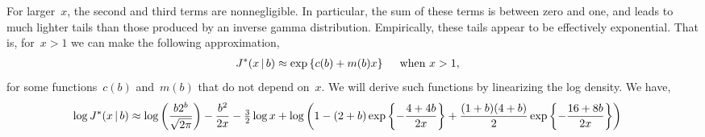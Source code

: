 \documentclass[aos,preprint]{imsart}
\begin{document}
For larger~$x$, the second and third terms are nonnegligible. In particular, the sum of these terms is between zero and one, and leads to much lighter tails than those
produced by an inverse gamma distribution. Empirically, these tails
appear to be effectively exponential. That is, for~$x>1$ we can make the following approximation,
\begin{align}
  \distJacobi(x \given b) &\approx \exp \left \{c(b) + m(b) x \right \}
  \quad \text{ when } x>1,
\end{align}
for some functions~$c(b)$ and~$m(b)$ that do not depend on~$x$.
We will derive such functions by linearizing the log density.
We have,
\begin{align}
  \log \distJacobi(x \given b) &\approx \log \left( \frac{b 2^b}{\sqrt{2 \pi}} \right)
   -\frac{b^2}{2x} - \tfrac{3}{2} \log x
  +\log \left( 1
        - (2+b) \exp \left \{-\frac{4+4b}{2x} \right \}
        + \frac{(1+b)(4+b)}{2}  \exp \left \{-\frac{16+8b}{2x} \right \}
        \right)
\end{align}







    


\end{document}
